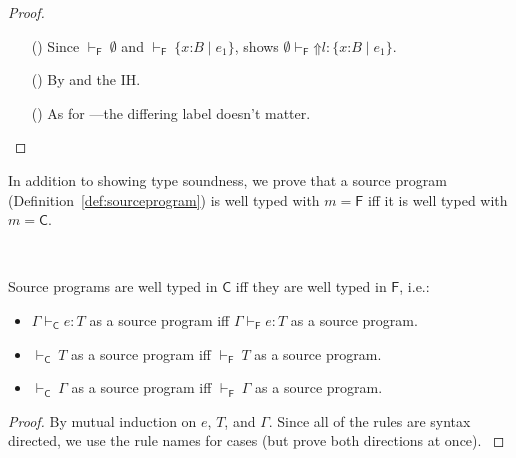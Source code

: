\documentclass[9pt]{extarticle}
\newcommand{\ottnt}[1]{\mathit{#1}}
\newcommand{\ottsym}[1]{#1}
\begin{document}
{\begin{lemma}
\begin{proof}
{\begin{itemize}
\begin{itemize}
        apply  to find $ \emptyset   \vdash _{  \mathsf{F}  }  \ottnt{k}  :   \{ \mathit{x} \mathord{:} \ottnt{B} \mathrel{\mid} \ottnt{e_{{\mathrm{1}}}} \}  $.
      \item[(\E{CheckFail})] Since $ \mathord{  \vdash _{  \mathsf{F}  } }~ \emptyset $ and $ \mathord{  \vdash _{  \mathsf{F}  } }~  \{ \mathit{x} \mathord{:} \ottnt{B} \mathrel{\mid} \ottnt{e_{{\mathrm{1}}}} \}  $,  shows $ \emptyset   \vdash _{  \mathsf{F}  }   \mathord{\Uparrow}  \ottnt{l}   :   \{ \mathit{x} \mathord{:} \ottnt{B} \mathrel{\mid} \ottnt{e_{{\mathrm{1}}}} \}  $.
      \item[(\E{CheckInner})] By  and the IH.
      \item[(\E{CheckRaise})] As for ---the differing
        label doesn't matter.
      \end{itemize}
    \end{itemize}
    \fi}
  \end{proof}
\end{lemma}

In addition to showing type soundness, we prove that a source program
(Definition~\ref{def:sourceprogram}) is well typed with $\ottnt{m}  \ottsym{=}   \mathsf{F} $ iff
it is well typed with $\ottnt{m}  \ottsym{=}   \mathsf{C} $.

\begin{lemma}
  \label{lem:forgetfulsource}
  ~

  \noindent
  Source programs are well typed in $ \mathsf{C} $ iff they are well typed in
  $ \mathsf{F} $, i.e.:
\begin{itemize}
  \item $ \Gamma   \vdash _{  \mathsf{C}  }  \ottnt{e}  :  \ottnt{T} $ as a source program iff $ \Gamma   \vdash _{  \mathsf{F}  }  \ottnt{e}  :  \ottnt{T} $ as a source program.
  \item $ \mathord{  \vdash _{  \mathsf{C}  } }~ \ottnt{T} $ as a source program iff $ \mathord{  \vdash _{  \mathsf{F}  } }~ \ottnt{T} $ as a source program.
  \item $ \mathord{  \vdash _{  \mathsf{C}  } }~ \Gamma $ as a source program iff $ \mathord{  \vdash _{  \mathsf{F}  } }~ \Gamma $ as a source program.
  \end{itemize}
\begin{proof}
    By mutual induction on $\ottnt{e}$, $\ottnt{T}$, and $\Gamma$.
{\iffull
    Since all of the rules are syntax directed, we use the rule names
    for cases (but prove both directions at once).
}
\end{proof}
\end{lemma}}
\end{document}
